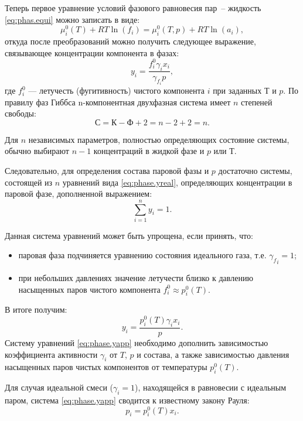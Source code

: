 Теперь первое уравнение условий фазового равновесия пар~-- жидкость \eqref{eq:phas.equi} можно записать в виде:
\begin{equation}
	\mu_i^0(T)+RT \ln (f_i)=\mu_i^0(T,p)+ R T \ln (a_i),
\end{equation}
откуда после преобразований можно получить следующее выражение, связывающее концентрации компонента в фазах:
\begin{equation} \label{eq:phase.yreal}
	y_i=\dfrac{f_i^0 \gamma_i x_i}{\gamma_{f_i} p},
\end{equation}
где $f_i^0$ --- летучесть (фугитивность) чистого компонента $i$ при заданных $Т$ и $p$. 
По правилу фаз Гиббса n-компонентная двухфазная система имеет $n$ степеней свободы:
\begin{equation*}
	С=К-Ф+2=n-2+2=n.
\end{equation*}

Для $n$ независимых параметров, полностью определяющих состояние системы, обычно выбирают $n-1$ концентраций в жидкой фазе и $p$ или $Т$.

Следовательно, для определения состава паровой	 фазы и $p$ достаточно системы, состоящей из $n$ уравнений вида \eqref{eq:phase.yreal}, определяющих концентрации в паровой фазе, дополненной выражением:
\begin{equation}
	\sum\limits_{i=1}^{n} y_i =1.
\end{equation}

Данная система уравнений может быть упрощена, если принять, что:
\begin{itemize}
	\item паровая фаза подчиняется  уравнению состояния идеального газа, т.е. ${\gamma_f}_i =1$;
	\item при небольших давлениях значение летучести близко к давлению насыщенных паров чистого компонента $f_i^0 \approx p^0_i (T)$.
\end{itemize}
В итоге получим:
\begin{equation} \label{eq:phase.yapp}
y_i=\dfrac{p_i^0(T) \gamma_i x_i}{ p}.
\end{equation}
Систему уравнений \eqref{eq:phase.yapp} необходимо дополнить зависимостью коэффициента активности $\gamma_i$ от $T$, $p$ и состава, а также зависимостью давления насыщенных паров чистых компонентов от температуры $p^0_i(T)$. 

Для случая идеальной смеси ($\gamma_i=1$), находящейся в равновесии с идеальным паром, система \eqref{eq:phase.yapp} сводится к известному закону Рауля:
\begin{equation} \label{eq.phase.raoul}
	p_i=p_i^0(T) x_i.
\end{equation}

